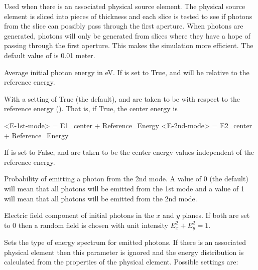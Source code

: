 {\begin{description}
%
  \item[\vn{ds_slice}] \Newline
Used when there is an associated physical source element. The physical source element is sliced into
pieces of thickness  and each slice is tested to see if photons from the slice can
possibly pass through the first aperture. When photons are generated, photons will only be generated
from slices where they have a hope of passing through the first aperture. This makes the simulation
more efficient.  The default value of  is 0.01 meter.
%
  \item[\vn{E_center}, \vn{E2_center}] \Newline
Average initial photon energy in eV. If  is set to True, 
and  will be relative to the reference energy.
%
  \item[\vn{E_center_relative_to_ref}] \Newline
With a setting of True (the default),  and  are taken to be with respect
to the reference energy (). That is, if True, the center energy  is
\begin{example}
  <E-1st-mode> = E1_center + Reference_Energy
  <E-2nd-mode> = E2_center + Reference_Energy
\end{example}
If  is set to False,  and  are taken to be
the center energy values independent of the reference energy.
%
  \item[\vn{E2_probability}] \Newline
Probability of emitting a photon from the 2nd mode. A value of 0 (the default) will mean
that all photons will be emitted from the 1st mode and a value of 1 will mean that
all photons will be emitted from the 2nd mode.
%
  \item[\vn{e_field_x}, \vn{e_field_y}] \Newline
Electric field component of initial photons in the $x$ and $y$ planes. If both are set to 0 then a
random field is chosen with unit intensity $E_x^2 + E_y^2 = 1$.
%
  \item[\vn{energy_distribution}] \Newline
Sets the type of energy spectrum for emitted photons. If there is an associated physical element
then this parameter is ignored and the energy distribution is calculated from the properties of the
physical element. Possible settings are:
\begin{example}

\end{example}
\end{description}}
